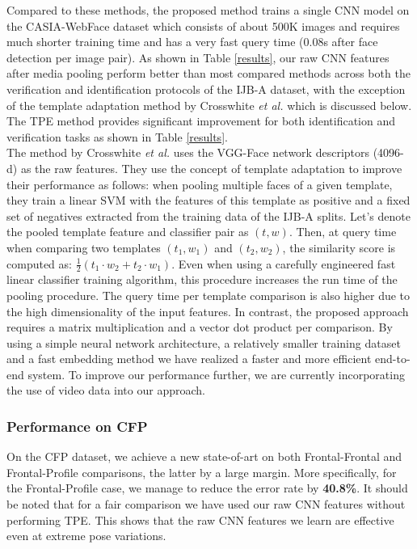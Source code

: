 \documentclass[10pt,twocolumn,letterpaper]{article}
\begin{document}
Compared to these methods, the proposed method trains a single CNN model on the
CASIA-WebFace dataset which consists of about 500K images and requires much
shorter training time and has a very fast query time (0.08s after face detection
per image pair). As shown in Table \ref{results}, our raw CNN features after media pooling perform better than most compared methods across both the  verification and identification protocols of the IJB-A dataset, with the exception of the template adaptation method by Crosswhite \emph{et al.} \cite{str-temp} which is discussed below. The TPE method provides significant improvement for both identification and verification tasks as shown in Table \ref{results}.\\

 The method by Crosswhite \emph{et al.} \cite{str-temp} uses the VGG-Face network \cite{parkhi15} descriptors (4096-d) as the raw features. They use the concept of template adaptation \cite{wolf} to improve their performance as follows: when pooling multiple faces of a given template, they train a linear SVM with the features of this template as positive and a
fixed set of negatives extracted from the training data of the IJB-A splits.
Let's denote the pooled template feature and classifier pair as $(t,w)$. Then, at
query time when comparing two templates $(t_1,w_1)$ and $(t_2,w_2)$, the similarity 
score is computed as: $\frac{1}{2} \left( t_1 \cdot w_2 + t_2 \cdot w_1
\right)$. Even when using a carefully engineered fast linear classifier training
algorithm, this procedure increases the run time of the pooling procedure. The query time per template comparison is also higher due to the high dimensionality of the input features. In contrast, the proposed approach requires a matrix multiplication and a vector dot product per 
comparison. By using a simple neural network architecture, a relatively smaller
training dataset and a fast embedding method we have realized a faster and more efficient end-to-end system. To improve our performance further, we are currently incorporating the use of video data into our approach. 
  


\subsubsection*{Performance on CFP}
On the CFP dataset, we achieve a new state-of-art on both Frontal-Frontal and
Frontal-Profile comparisons, the latter by a large margin. More specifically,
for the Frontal-Profile case, we manage to reduce the error rate by
\textbf{40.8\%}. It should be noted that for a fair comparison we have used our
raw CNN features without performing TPE. This shows that the raw CNN features we
learn are effective even at extreme pose variations. 
\end{document}
